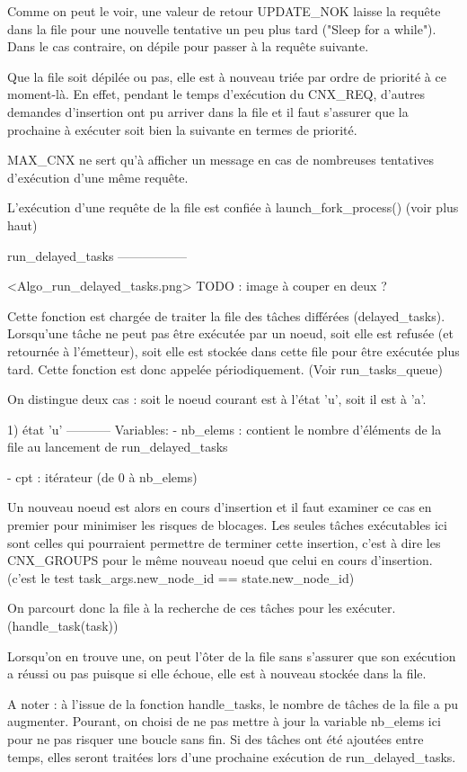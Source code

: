 Comme on peut le voir, une valeur de retour UPDATE_NOK laisse la requête dans la file pour une
nouvelle tentative un peu plus tard ("Sleep for a while"). Dans le cas contraire, on dépile pour
passer à la requête suivante.

Que la file soit dépilée ou pas, elle est à nouveau triée par ordre de priorité à ce moment-là. En
effet, pendant le temps d'exécution du CNX_REQ, d'autres demandes d'insertion ont pu arriver dans la
file et il faut s'assurer que la prochaine à exécuter soit bien la suivante en termes de priorité.

MAX_CNX ne sert qu'à afficher un message en cas de nombreuses tentatives d'exécution d'une même
requête.

L'exécution d'une requête de la file est confiée à launch_fork_process() (voir plus haut)


run_delayed_tasks
-----------------

<Algo_run_delayed_tasks.png> TODO : image à couper en deux ?

Cette fonction est chargée de traiter la file des tâches différées (delayed_tasks). Lorsqu'une tâche
ne peut pas être exécutée par un noeud, soit elle est refusée (et retournée à l'émetteur), soit
elle est stockée dans cette file pour être exécutée plus tard. Cette fonction est donc appelée
périodiquement. (Voir run_tasks_queue)

On distingue deux cas : soit le noeud courant est à l'état 'u', soit il est à 'a'.

1) état 'u'
-----------
Variables:
    - nb_elems : contient le nombre d'éléments de la file au lancement de run_delayed_tasks

    - cpt      : itérateur (de 0 à nb_elems)

Un nouveau noeud est alors en cours d'insertion et il faut examiner ce cas en premier pour minimiser
les risques de blocages.
Les seules tâches exécutables ici sont celles qui pourraient permettre de terminer cette insertion,
c'est à dire les CNX_GROUPS pour le même nouveau noeud que celui en cours d'insertion.
(c'est le test task_args.new_node_id == state.new_node_id)

On parcourt donc la file à la recherche de ces tâches pour les exécuter. (handle_task(task))

Lorsqu'on en trouve une, on peut l'ôter de la file sans s'assurer que son exécution a réussi ou pas
puisque si elle échoue, elle est à nouveau stockée dans la file.

A noter : à l'issue de la fonction handle_tasks, le nombre de tâches de la file a pu augmenter.
Pourant, on choisi de ne pas mettre à jour la variable nb_elems ici pour ne pas risquer une boucle
sans fin. Si des tâches ont été ajoutées entre temps, elles seront traitées lors d'une prochaine
exécution de run_delayed_tasks.

